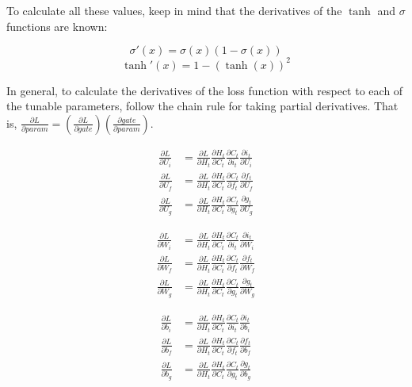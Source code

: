 \documentclass[12pt]{article}
\begin{document}
To calculate all these values, keep in mind that the derivatives of the $\tanh$
and $\sigma$ functions are known:

\begin{equation}
    \sigma'(x) = \sigma(x)(1-\sigma(x))
\end{equation}
\begin{equation}
    \tanh'(x) = 1 - (\tanh(x))^2
\end{equation}

In general, to calculate the derivatives of the loss function with respect to
each of the tunable parameters, follow the chain rule for taking partial
derivatives. That is, $\frac{\partial L}{\partial param} = (\frac{\partial L}{\partial gate}) (\frac{\partial gate}{\partial param})$.

\begin{align*}
    \frac{\partial L}{\partial U_i} & = \frac{\partial L}{\partial H_t} \frac{\partial H_t}{\partial C_t} \frac{\partial C_t}{\partial i_t} \frac{\partial i_t}{\partial U_i} \\ \frac{\partial L}{\partial U_f} & = \frac{\partial L}{\partial H_t} \frac{\partial H_t}{\partial C_t} \frac{\partial C_t}{\partial f_t} \frac{\partial f_t}{\partial U_f} \\ \frac{\partial L}{\partial U_g} & = \frac{\partial L}{\partial H_t} \frac{\partial H_t}{\partial C_t} \frac{\partial C_t}{\partial g_t} \frac{\partial g_t}{\partial U_g}
\end{align*}

\begin{align*}
    \frac{\partial L}{\partial W_i} & = \frac{\partial L}{\partial H_t} \frac{\partial H_t}{\partial C_t} \frac{\partial C_t}{\partial i_t} \frac{\partial i_t}{\partial W_i} \\ \frac{\partial L}{\partial W_f} & = \frac{\partial L}{\partial H_t} \frac{\partial H_t}{\partial C_t} \frac{\partial C_t}{\partial f_t} \frac{\partial f_t}{\partial W_f} \\ \frac{\partial L}{\partial W_g} & = \frac{\partial L}{\partial H_t} \frac{\partial H_t}{\partial C_t} \frac{\partial C_t}{\partial g_t} \frac{\partial g_t}{\partial W_g}
\end{align*}

\begin{align*}
    \frac{\partial L}{\partial b_i} & = \frac{\partial L}{\partial H_t} \frac{\partial H_t}{\partial C_t} \frac{\partial C_t}{\partial i_t} \frac{\partial i_t}{\partial b_i} \\ \frac{\partial L}{\partial b_f} & = \frac{\partial L}{\partial H_t} \frac{\partial H_t}{\partial C_t} \frac{\partial C_t}{\partial f_t} \frac{\partial f_t}{\partial b_f} \\ \frac{\partial L}{\partial b_g} & = \frac{\partial L}{\partial H_t} \frac{\partial H_t}{\partial C_t} \frac{\partial C_t}{\partial g_t} \frac{\partial g_t}{\partial b_g}
\end{align*}
\end{document}
